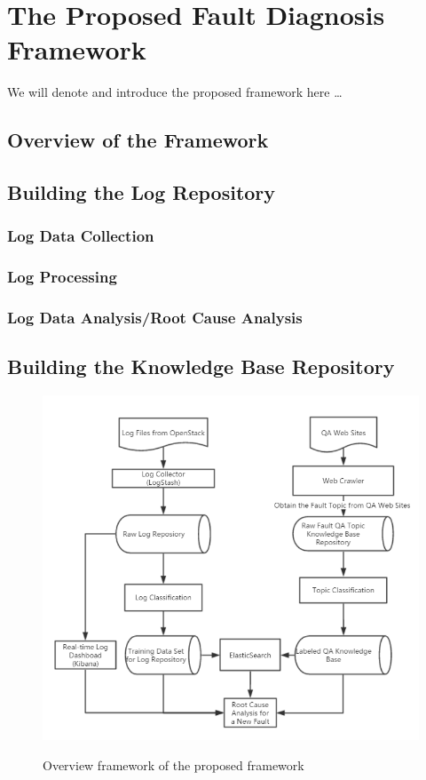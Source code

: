 
\section{The Proposed Fault Diagnosis Framework}

We will denote and introduce the proposed framework here \ldots

\subsection{Overview of the Framework}
\subsection{Building the Log Repository}
\subsubsection{Log Data Collection}
\subsubsection{Log Processing}
\subsubsection{Log Data Analysis/Root Cause Analysis}
\subsection{Building the Knowledge Base Repository}


\begin{figure}


\includegraphics[scale=0.6]{./figures/Fig1.png} \label{Fig1.}
\caption{Overview framework of the proposed framework}
\end{figure}
